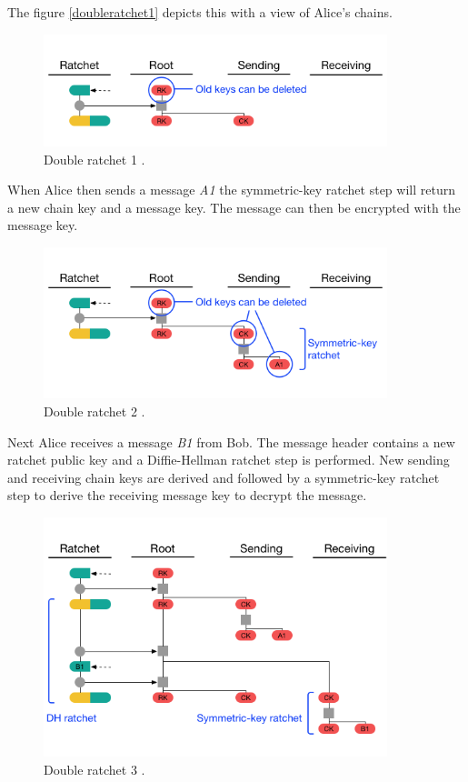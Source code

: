 The figure \ref{doubleratchet1} depicts this with a view of Alice's chains.


\begin{figure}[H]
	\centering
	\includegraphics[width=10cm]{figures/doubleratchet1.png}
	\caption{Double ratchet 1 \cite{doubleratchet}.}
	\label{fig:doubleratchet1}
\end{figure}

When Alice then sends a message \emph{A1} the symmetric-key ratchet step will return a new chain key and a message key. The message can then be encrypted with the message key.

\begin{figure}[H]
	\centering
	\includegraphics[width=10cm]{figures/doubleratchet2.png}
	\caption{Double ratchet 2 \cite{doubleratchet}.}
	\label{fig:doubleratchet2}
\end{figure}

Next Alice receives a message \emph{B1} from Bob. The message header contains a new ratchet public key and a Diffie-Hellman ratchet step is performed. New sending and receiving chain keys are derived and followed by a symmetric-key ratchet step to derive the receiving message key to decrypt the message.

\begin{figure}[H]
	\centering
	\includegraphics[width=10cm]{figures/doubleratchet3.png}
	\caption{Double ratchet 3 \cite{doubleratchet}.}
	\label{fig:doubleratchet3}
\end{figure}






